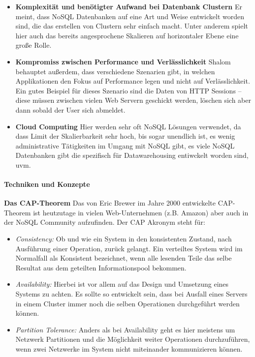 \begin{itemize}
	\item \textbf{Komplexität und benötigter Aufwand bei Datenbank Clustern}\newline
	 Er meint, dass NoSQL Datenbanken auf eine Art und Weise entwickelt worden sind, die das erstellen von Clustern sehr einfach macht. Unter anderem spielt hier auch das bereits angesprochene Skalieren auf horizontaler Ebene eine große Rolle.
	
	\item \textbf{Kompromiss zwischen Performance und Verlässlichkeit}\newline
	 Shalom behauptet außerdem, dass verschiedene Szenarien gibt, in welchen Applikationen den Fokus auf Performance legen und nicht auf Verlässlichkeit. Ein gutes Beispiel für dieses Szenario sind die Daten von HTTP Sessions – diese müssen zwischen vielen Web Servern geschickt werden, löschen sich aber dann sobald der User sich abmeldet.

	\item \textbf{Cloud Computing}\newline
	 Hier werden sehr oft NoSQL Lösungen verwendet, da dass Limit der Skalierbarkeit sehr hoch, bis sogar unendlich ist, es wenig administrative Tätigkeiten im Umgang mit NoSQL gibt, es viele NoSQL Datenbanken gibt die spezifisch für Datawarehousing entiwckelt worden sind, uvm.
\end{itemize}

\paragraph{Techniken und Konzepte\newline}
\htab\textbf{Das CAP-Theorem\newline}
Das von Eric Brewer im Jahre 2000 entwickelte CAP-Theorem ist heutzutage in vielen Web-Unternehmen (z.B. Amazon) aber auch in der NoSQL Community aufzufinden\cite{MELD.CH2-noSQL.capTheorem}. Der CAP Akronym steht für:

\begin{itemize}
	\item \textit{Consistency:} Ob und wie ein System in den konsistenten Zustand, nach Ausführung einer Operation, zurück gelangt. Ein verteiltes System wird im Normalfall als Konsistent bezeichnet, wenn alle lesenden Teile das selbe Resultat aus dem geteilten Informationspool bekommen.

	\item \textit{Availability:} Hierbei ist vor allem auf das Design und Umsetzung eines Systems zu achten. Es sollte so entwickelt sein, dass bei Ausfall eines Servers in einem Cluster immer noch die selben Operationen durchgeführt werden können.

	\item \textit{Partition Tolerance:} Anders als bei Availability geht es hier meistens um Netzwerk Partitionen und die Möglichkeit weiter Operationen durchzuführen, wenn zwei Netzwerke im System nicht miteinander kommunizieren können.
\end{itemize}


